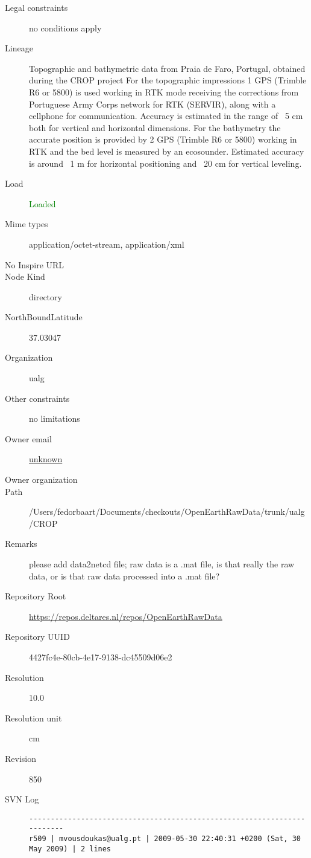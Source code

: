 \documentclass[9]{report}
\begin{document}
\begin{description}
  \item[Legal constraints] no conditions apply
  \item[Lineage] Topographic and bathymetric data from Praia de Faro, Portugal, obtained during the CROP project
For the topographic impressions 1 GPS (Trimble R6 or 5800) is used working in RTK mode receiving the corrections from Portuguese Army Corps network for RTK (SERVIR), along with a cellphone for communication. Accuracy is estimated in the range of ~5 cm both for vertical and horizontal dimensions. For the bathymetry the accurate position is provided by 2 GPS (Trimble R6 or 5800) working in RTK and the bed level is measured by an ecosounder. Estimated accuracy is around ~1 m for horizontal positioning and ~20 cm for vertical leveling.
  \item[Load] \textcolor{green}{Loaded}
  \item[Mime types] application/octet-stream, application/xml
  \item[No Inspire URL] 
  \item[Node Kind] directory
  \item[NorthBoundLatitude] 37.03047
  \item[Organization] ualg
  \item[Other constraints] no limitations
  \item[Owner email] \href{mailto:unknown}{unknown}
  \item[Owner organization] 
  \item[Path] /Users/fedorbaart/Documents/checkouts/OpenEarthRawData/trunk/ualg/CROP
  \item[Remarks] please add data2netcd file; raw data is a .mat file, is that really the raw data, or is that raw data processed into a .mat file?
  \item[Repository Root] \href{https://repos.deltares.nl/repos/OpenEarthRawData}{https://repos.deltares.nl/repos/OpenEarthRawData}
  \item[Repository UUID] 4427fc4e-80cb-4e17-9138-dc45509d06e2
  \item[Resolution] 10.0
  \item[Resolution unit] cm
  \item[Revision] 850
  \item[SVN Log] \begin{verbatim}
------------------------------------------------------------------------
r509 | mvousdoukas@ualg.pt | 2009-05-30 22:40:31 +0200 (Sat, 30 May 2009) | 2 lines




\end{verbatim}
\end{description}
\end{document}

